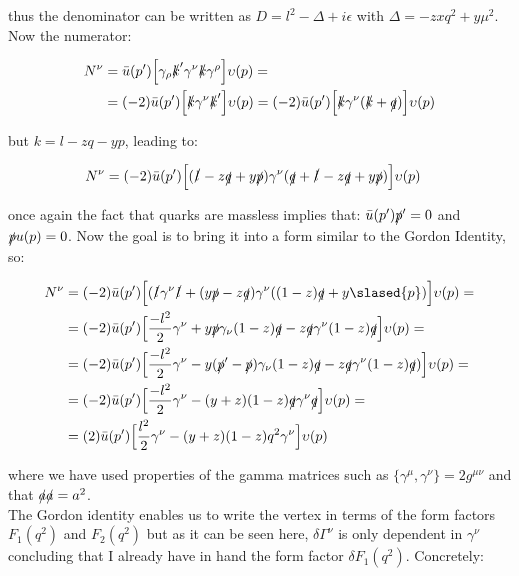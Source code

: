 \documentclass[a4paper,10pt]{article}
\begin{document}
thus the denominator can be written as $D=l^{2}-\Delta+i\epsilon$ with $\Delta=-zxq^{2}+y\mu^{2}$. \\
Now the numerator:

\begin{align*}
 N^{\nu}&=\bar{u}(p')\Big[\gamma_{\rho}\slashed{k}'\gamma^{\nu}\slashed{k}\gamma^{\rho}\Big]\upsilon(p)=\\
 &=(-2)\bar{u}(p')\Big[\slashed{k}\gamma^{\nu}\slashed{k}'\Big]\upsilon(p)=(-2)\bar{u}(p')\Big[\slashed{k}\gamma^{\nu}(\slashed{k}+\slashed{q})\Big]\upsilon(p)
\end{align*}

but $k=l-zq-yp$,  leading to:

\begin{align*}
 N^{\nu}&=(-2)\bar{u}(p')\Big[(\slashed{l}-z\slashed{q}+y\slashed{p})\gamma^{\nu}(\slashed{q}+\slashed{l}-z\slashed{q}+y\slashed{p})\Big]\upsilon(p)
\end{align*}

 once again the fact that quarks are massless implies that: $\bar{u}(p')\slashed{p}'=0$ and $\slashed{p}u(p)=0$. Now the goal is to bring it 
 into a form similar to the Gordon Identity, so:
 
 \begin{align*}
   N^{\nu}&=(-2)\bar{u}(p')\Big[(\slashed{l}\gamma^{\nu}\slashed{l}+(y\slashed{p}-z\slashed{q})\gamma^{\nu}((1-z)\slashed{q}+y\slased{p})\Big]\upsilon(p)=\\
          &=(-2)\bar{u}(p')\Big[\frac{-l^{2}}{2}\gamma^{\nu}+y\slashed{p}\gamma_{\nu}(1-z)\slashed{q}-z\slashed{q}\gamma^{\nu}(1-z)\slashed{q}\Big]\upsilon(p)=\\
	  &=(-2)\bar{u}(p')\Big[\frac{-l^{2}}{2}\gamma^{\nu}-y(\slashed{p}'-\slashed{p})\gamma_{\nu}(1-z)\slashed{q}-z\slashed{q}\gamma^{\nu}(1-z)\slashed{q})\Big]\upsilon(p)=\\
	  &=(-2)\bar{u}(p')\Big[\frac{-l^{2}}{2}\gamma^{\nu}-(y+z)(1-z)\slashed{q}\gamma^{\nu}\slashed{q}\Big]\upsilon(p)=\\
	  &=(2)\bar{u}(p')\Big[\frac{l^{2}}{2}\gamma^{\nu}-(y+z)(1-z)q^{2}\gamma^{\nu}\Big]\upsilon(p)
\end{align*}

where we have used properties of the gamma matrices such as $\{\gamma^{\mu},\gamma^{\nu}\}=2g^{\mu\nu}$ and that 
$\slashed{a}\slashed{a}=a^{2}$.\\
The Gordon identity enables us to write the vertex in terms of the form factors $F_{1}(q^{2})$ and $F_{2}(q^{2})$ 
but as it can be seen here, $\delta\Gamma^{\nu}$ is only dependent in $\gamma^{\nu}$ concluding that I already have in 
hand the form factor $\delta F_{1}(q^{2})$. Concretely: 
\end{document}
